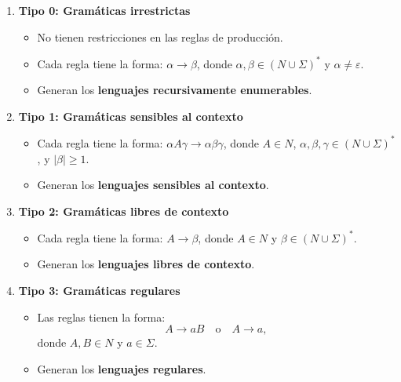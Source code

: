 \documentclass{article}
\begin{document}
\begin{enumerate}
      \item \textbf{Tipo 0: Gramáticas irrestrictas}
            \begin{itemize}
                  \item No tienen restricciones en las reglas de producción.
                  \item Cada regla tiene la forma: \(\alpha \to \beta\), donde \(\alpha, \beta \in (N \cup \Sigma)^*\) y \(\alpha \neq \varepsilon\).
                  \item Generan los \textbf{lenguajes recursivamente enumerables}.
            \end{itemize}
            
      \item \textbf{Tipo 1: Gramáticas sensibles al contexto}
            \begin{itemize}
                  \item Cada regla tiene la forma: \(\alpha A \gamma \to \alpha \beta \gamma\), donde \(A \in N\), \(\alpha, \beta, \gamma \in (N \cup \Sigma)^*\), y \(|\beta| \geq 1\).
                  \item Generan los \textbf{lenguajes sensibles al contexto}.
            \end{itemize}
            
      \item \textbf{Tipo 2: Gramáticas libres de contexto}
            \begin{itemize}
                  \item Cada regla tiene la forma: \(A \to \beta\), donde \(A \in N\) y \(\beta \in (N \cup \Sigma)^*\).
                  \item Generan los \textbf{lenguajes libres de contexto}.
            \end{itemize}
            
      \item \textbf{Tipo 3: Gramáticas regulares}
            \begin{itemize}
                  \item Las reglas tienen la forma:
                        \[
                              A \to aB \quad \text{o} \quad A \to a,
                        \]
                        donde \(A, B \in N\) y \(a \in \Sigma\).
                  \item Generan los \textbf{lenguajes regulares}.
            \end{itemize}
\end{enumerate}
\end{document}
